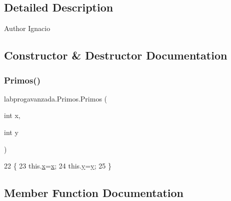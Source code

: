 \subsection{Detailed Description}
\begin{DoxyAuthor}{Author}
Ignacio 
\end{DoxyAuthor}


\subsection{Constructor \& Destructor Documentation}
\mbox{\label{classlabprogavanzada_1_1_primos_a43f14cebd555907aaaf5270a66055f6a}} 
\subsubsection{\texorpdfstring{Primos()}{Primos()}}
{\footnotesize\ttfamily labprogavanzada.\+Primos.\+Primos (\begin{DoxyParamCaption}\item[{int}]{x,  }\item[{int}]{y }\end{DoxyParamCaption})\hspace{0.3cm}{\ttfamily [inline]}}


\begin{DoxyCode}
22                                \{
23         this.\mbox{\hyperlink{classlabprogavanzada_1_1_primos_a0755e3305c771aa34e184c9719b0e2ff}{x}}=\mbox{\hyperlink{classlabprogavanzada_1_1_primos_a0755e3305c771aa34e184c9719b0e2ff}{x}};
24         this.\mbox{\hyperlink{classlabprogavanzada_1_1_primos_a5a48c8b02403aee0c1741dd3abf91f47}{y}}=\mbox{\hyperlink{classlabprogavanzada_1_1_primos_a5a48c8b02403aee0c1741dd3abf91f47}{y}};
25     \}
\end{DoxyCode}


\subsection{Member Function Documentation}
\mbox{\label{classlabprogavanzada_1_1_primos_a6127829b3e6ef1830edf5714b0cc28a8}} 
